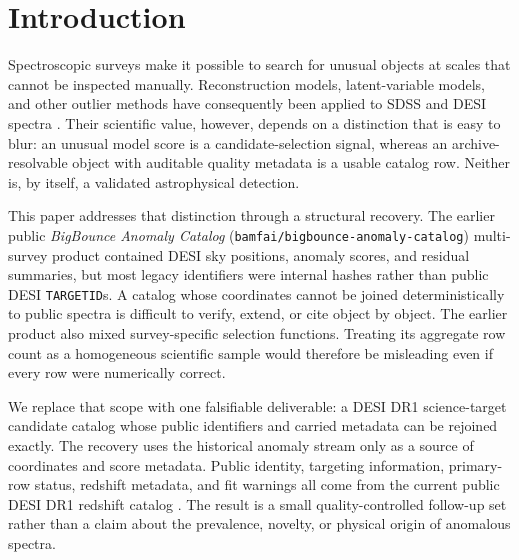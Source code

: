 \documentclass[twocolumn,linenumbers]{aastex702}
\begin{document}

\section{Introduction}\label{sec:introduction}

Spectroscopic surveys make it possible to search for unusual objects at scales that cannot be
inspected manually.  Reconstruction models, latent-variable models, and other outlier methods
have consequently been applied to SDSS and DESI spectra \citep{Baron2017,Liang2023,Nicolaou2026}.
Their scientific value, however, depends on a distinction that is easy to blur: an unusual model
score is a candidate-selection signal, whereas an archive-resolvable object with auditable
quality metadata is a usable catalog row.  Neither is, by itself, a validated astrophysical
detection.

This paper addresses that distinction through a structural recovery.  The earlier public
\textit{BigBounce Anomaly Catalog} (\nolinkurl{bamfai/bigbounce-anomaly-catalog}) multi-survey
product contained DESI sky positions, anomaly scores, and residual summaries, but most
legacy identifiers were internal hashes rather than public DESI \texttt{TARGETID}s.  A catalog
whose coordinates cannot be joined deterministically to public spectra is difficult to verify,
extend, or cite object by object.  The earlier product also mixed survey-specific selection
functions.  Treating its aggregate row count as a homogeneous scientific sample would therefore
be misleading even if every row were numerically correct.

We replace that scope with one falsifiable deliverable: a DESI DR1 science-target candidate
catalog whose public identifiers and carried metadata can be rejoined exactly.  The recovery
uses the historical anomaly stream only as a source of coordinates and score metadata.  Public
identity, targeting information, primary-row status, redshift metadata, and fit warnings all
come from the current public DESI DR1 redshift catalog \citep{DESI2025DR1}.  The result is a small
quality-controlled follow-up set rather than a claim about the prevalence, novelty, or physical
origin of anomalous spectra.
\end{document}
